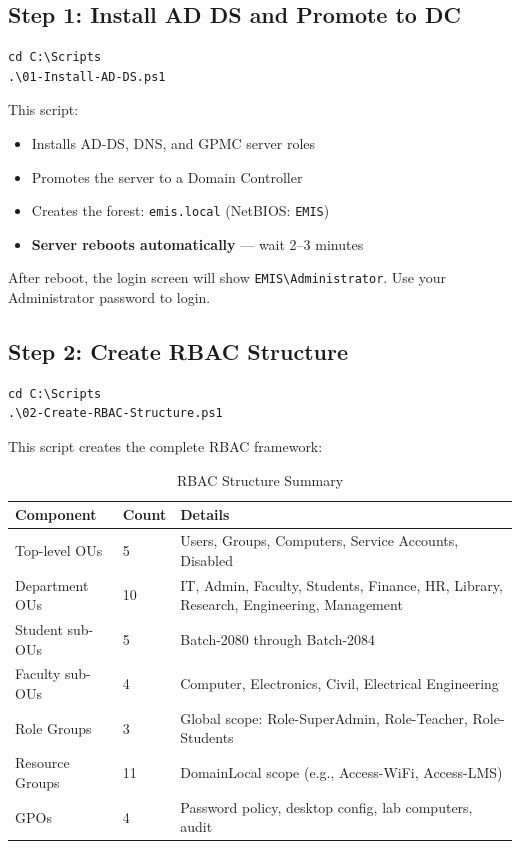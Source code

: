 ﻿\documentclass[12pt,a4paper]{article}
\begin{document}
\subsection{Step 1: Install AD DS and Promote to DC}

\begin{lstlisting}
cd C:\Scripts
.\01-Install-AD-DS.ps1
\end{lstlisting}

This script:
\begin{itemize}
    \item Installs AD-DS, DNS, and GPMC server roles
    \item Promotes the server to a Domain Controller
    \item Creates the forest: \texttt{emis.local} (NetBIOS: \texttt{EMIS})
    \item \textbf{Server reboots automatically} --- wait 2--3 minutes
\end{itemize}

\begin{warningbox}
After reboot, the login screen will show \texttt{EMIS\textbackslash Administrator}. Use your Administrator password to login.
\end{warningbox}

\subsection{Step 2: Create RBAC Structure}

\begin{lstlisting}
cd C:\Scripts
.\02-Create-RBAC-Structure.ps1
\end{lstlisting}

This script creates the complete RBAC framework:

\begin{table}[H]
\centering
\begin{tabularx}{\textwidth}{l l X}
\toprule
\textbf{Component} & \textbf{Count} & \textbf{Details} \\
\midrule
Top-level OUs        & 5  & Users, Groups, Computers, Service Accounts, Disabled \\
Department OUs       & 10 & IT, Admin, Faculty, Students, Finance, HR, Library, Research, Engineering, Management \\
Student sub-OUs      & 5  & Batch-2080 through Batch-2084 \\
Faculty sub-OUs      & 4  & Computer, Electronics, Civil, Electrical Engineering \\
Role Groups          & 3  & Global scope: Role-SuperAdmin, Role-Teacher, Role-Students \\
Resource Groups      & 11 & DomainLocal scope (e.g., Access-WiFi, Access-LMS) \\
GPOs                 & 4  & Password policy, desktop config, lab computers, audit \\
\bottomrule
\end{tabularx}
\caption{RBAC Structure Summary}
\end{table}
\end{document}
